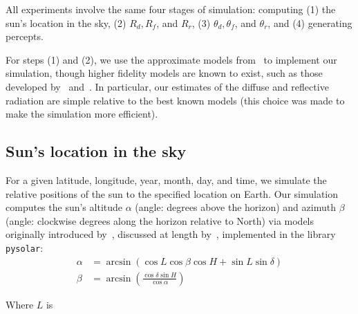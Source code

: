 \documentclass{article}
\begin{document}
All experiments involve the same four stages of simulation: computing (1) the sun's location in the sky, (2) $R_d, R_f$, and $R_r$, (3) $\theta_d, \theta_f$, and $\theta_r$, and (4) generating percepts.

For steps (1) and (2), we use the approximate models from~\citet{masters2013renewable} to implement our simulation, though higher fidelity models are known to exist, such as those developed by~\citet{andersen1980comments,klein1977calculation} and~\citet{kamali2006estimating}. In particular, our estimates of the diffuse and reflective radiation are simple relative to the best known models (this choice was made to make the simulation more efficient).

\subsection{Sun's location in the sky}
For a given latitude, longitude, year, month, day, and time, we simulate the relative positions of the sun to the specified location on Earth. Our simulation computes the sun's altitude $\alpha$ (angle: degrees above the horizon) and azimuth $\beta$ (angle: clockwise degrees along the horizon relative to North) via models originally introduced by~\citet{jordan1958chafer}, discussed at length by~\citet{masters2013renewable}, implemented in the library \texttt{pysolar}:
\begin{align}
\alpha &= \arcsin(\cos L \cos \beta \cos H + \sin L \sin \delta)\\
\beta &= \arcsin\left(\frac{\cos \delta \sin H}{\cos \alpha}\right)
\end{align}

Where $L$ is 

\end{document}
